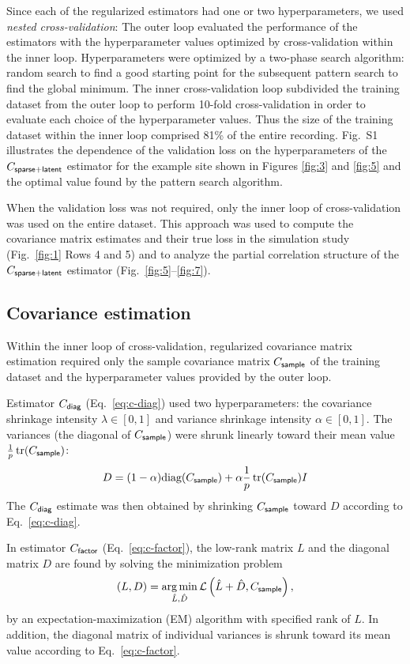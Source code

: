 Since each of the regularized estimators had one or two hyperparameters, we used \emph{nested cross-validation}:  The outer loop evaluated the performance of the estimators with the hyperparameter values optimized by cross-validation within the inner loop.  Hyperparameters were optimized by a two-phase search algorithm: random search to find a good starting point for the subsequent pattern search to find the global minimum.  The inner cross-validation loop subdivided the training dataset from the outer loop to perform 10-fold cross-validation in order to evaluate each choice of the hyperparameter values.  Thus the size of the training dataset within the inner loop comprised 81\% of the entire recording. Fig.~S1 illustrates the dependence of the validation loss on the hyperparameters of the $C_{\sf sparse+latent}$ estimator for the example site shown in Figures \ref{fig:3} and \ref{fig:5} and the optimal value found by the pattern search algorithm.

When the validation loss was not required, only the inner loop of cross-validation was used on the entire dataset.  This approach was used to compute the covariance matrix estimates and their true loss in the simulation study (Fig.~\ref{fig:1} Rows 4 and 5) and to analyze the partial correlation structure of the $C_{\sf sparse+latent}$ estimator (Fig.~\ref{fig:5}--\ref{fig:7}).

\subsection*{Covariance estimation}
Within the inner loop of cross-validation, regularized covariance matrix estimation required only the sample covariance matrix $C_{\sf sample}$ of the training dataset and the hyperparameter values provided by the outer loop.

Estimator $C_{\sf diag}$ (Eq.~\ref{eq:c-diag})  used two hyperparameters: the covariance shrinkage intensity $\lambda \in [0,1]$ and variance shrinkage intensity $\alpha \in [0,1]$.  The variances (the diagonal of $C_{\sf sample}$) were shrunk linearly toward their mean value $\frac 1 p \operatorname{tr}(C_{\sf sample})$:
\begin{equation}
D = (1-\alpha)\mbox{diag}(C_{\sf sample}) + \alpha \frac 1 p \operatorname{tr}(C_{\sf sample}) I
\end{equation}
The $C_{\sf diag}$ estimate was then obtained by shrinking $C_{\sf sample}$ toward $D$ according to Eq.~\ref{eq:c-diag}.

In estimator $C_{\sf factor}$ (Eq.~\ref{eq:c-factor}), the low-rank matrix $L$ and the diagonal matrix $D$ are found by solving the minimization problem
\begin{equation}
(L,D) = \operatorname*{arg\,min}\limits_{\hat L,\hat D} \mathcal L\left(\hat L + \hat D,C_{\sf sample}\right),
\end{equation}
by an expectation-maximization (EM) algorithm with specified rank of $L$. In addition, the diagonal matrix of individual variances is shrunk toward its mean value according to Eq.~\ref{eq:c-factor}.

